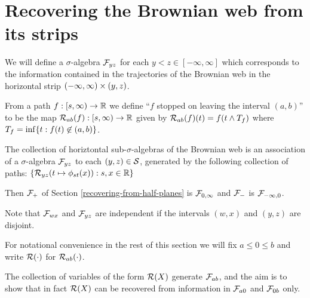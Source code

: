 {
\section{Recovering the Brownian web from its strips}

We will define a $\sigma$-algebra $\mathcal{F}_{y z}$ for each $y < z \in
[-\infty, \infty]$ which corresponds to the information contained in
the trajectories of the Brownian web in the horizontal strip
$(-\infty, \infty) \times (y,z)$.

\begin{definition}
  \newcommand{\T}{\stripleavetime{f}}
  \label{def:restrict}
  From a path $f : [s, \infty) \to \mathbb{R}$ we define ``$f$ stopped on
    leaving the interval $(a,b)$'' to be the map $\mathcal{R}_{{a}{b}}(f) : [s,
      \infty) \to \mathbb{R}$ given by $\restrict{a}{b}{f}(t) = f(t \minsym \T)$
      where $\T = \inf\{ t : f(t) \not\in (a,b) \}$.
\end{definition}

\newcommand{\brownianwebnoise}{collection of horiztontal
  sub-$\sigma$-algebras of the Brownian web}

\begin{definition}
  The \brownianwebnoise{} is an
  association of a $\sigma$-algebra $\mathcal{F}_{y z}$ to each $(y, z)
  \in \mathcal{S}$, generated by the following collection of paths:
  $\{ \mathcal{R}_{{y}{z}}(t \mapsto \phi_{{s}{t}}(x)) : s, x \in \mathbb{R} \}$
\end{definition}

Then $\mathcal{F}_{+}$ of Section \ref{recovering-from-half-planes} is
$\mathcal{F}_{0,\infty}$ and $\mathcal{F}_{-}$ is
$\mathcal{F}_{-\infty,0}$.

\begin{observation}
  Note that $\mathcal{F}_{w x}$ and $\mathcal{F}_{y z}$ are independent if the
  intervals $(w,x)$ and $(y,z)$ are disjoint.
\end{observation}

\renewcommand{\top}{b}
\newcommand{\bottom}{a}

For notational convenience in the rest of this
section we will fix $\bottom \le 0 \le \top$ and write $\mathcal{R}(\cdot)$ for
$\restrict{\bottom}{\top}{\cdot}$.

\newcommand{\Resresamplede}{\Res{\resamplede}}
\newcommand{\Ressampled}{\Res{\sampled}}

The collection of variables of the form $\Ressampled$ generate
$\factor{\bottom}{\top}$, and the aim is to show that in fact $\Ressampled$ can
be recovered from information in $\factor{\bottom}{0}$ and $\factor{0}{\top}$
only.

}

